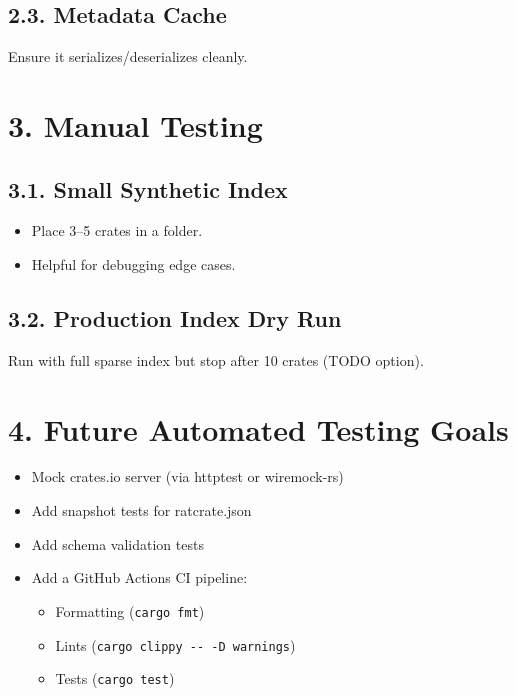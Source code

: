\documentclass[
  letterpaper,
  DIV=11,
  numbers=noendperiod]{scrreprt}
\providecommand{\tightlist}{%
  \setlength{\itemsep}{0pt}\setlength{\parskip}{0pt}}
\begin{document}
\subsection{2.3. Metadata Cache}\label{metadata-cache-1}

Ensure it serializes/deserializes cleanly.

\section{3. Manual Testing}\label{manual-testing}

\subsection{3.1. Small Synthetic Index}\label{small-synthetic-index}

\begin{itemize}
\tightlist
\item[$\square$]
  Place 3--5 crates in a folder.
\item[$\square$]
  Helpful for debugging edge cases.
\end{itemize}

\subsection{3.2. Production Index Dry
Run}\label{production-index-dry-run}

Run with full sparse index but stop after 10 crates (TODO option).

\section{4. Future Automated Testing
Goals}\label{future-automated-testing-goals}

\begin{itemize}
\tightlist
\item
  Mock crates.io server (via httptest or wiremock-rs)
\item
  Add snapshot tests for ratcrate.json
\item
  Add schema validation tests
\item
  Add a GitHub Actions CI pipeline:

  \begin{itemize}
  \tightlist
  \item
    Formatting (\texttt{cargo\ fmt})
  \item
    Lints (\texttt{cargo\ clippy\ -\/-\ -D\ warnings})
  \item
    Tests (\texttt{cargo\ test})
  \end{itemize}
\end{itemize}
\end{document}
